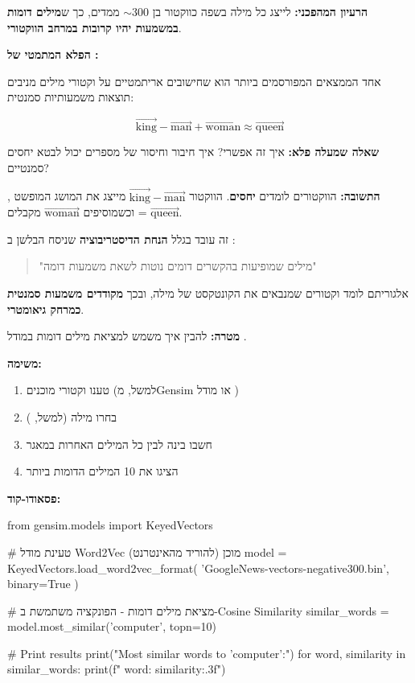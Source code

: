 \textbf{הרעיון המהפכני:} לייצג כל מילה בשפה כווקטור בן $\sim\num{300}$ ממדים, כך ש\textbf{מילים דומות במשמעות יהיו קרובות במרחב הווקטורי}.

\textbf{הפלא המתמטי של :}

אחד הממצאים המפורסמים ביותר הוא שחישובים אריתמטיים על וקטורי מילים מניבים תוצאות משמעותיות סמנטית:

\[
\vec{\text{king}} - \vec{\text{man}} + \vec{\text{woman}} \approx \vec{\text{queen}}
\]

\textbf{שאלה שמעלה פלא:} איך זה אפשרי? איך חיבור וחיסור של מספרים יכול לבטא יחסים סמנטיים?

\textbf{התשובה:} הווקטורים לומדים \textbf{יחסים}. הווקטור $\vec{\text{king}} - \vec{\text{man}}$ מייצג את המושג המופשט , וכשמוסיפים $\vec{\text{woman}}$ מקבלים  = $\vec{\text{queen}}$.

זה עובד בגלל \textbf{הנחת הדיסטריבוציה}  שניסח הבלשן  ב\en{-} \cite{harris1954}:

\begin{quote}
\textit{}

"מילים שמופיעות בהקשרים דומים נוטות לשאת משמעות דומה"
\end{quote}

אלגוריתם  לומד וקטורים שמנבאים את הקונטקסט של מילה, ובכך \textbf{מקודדים משמעות סמנטית כמרחק גיאומטרי}.


\textbf{מטרה:} להבין איך  משמש למציאת מילים דומות במודל .

\textbf{משימה:}
\begin{enumerate}
\item טענו וקטורי  מוכנים (למשל, מ\en{-}Gensim או מודל )
\item בחרו מילה (למשל, )
\item חשבו  בינה לבין כל המילים האחרות במאגר
\item הציגו את \num{10} המילים הדומות ביותר
\end{enumerate}

\textbf{פסאודו-קוד:}

\begin{pythonbox}
from gensim.models import KeyedVectors

# טעינת מודל Word2Vec מוכן (להוריד מהאינטרנט)
model = KeyedVectors.load_word2vec_format(
    'GoogleNews-vectors-negative300.bin', 
    binary=True
)

# מציאת מילים דומות - הפונקציה משתמשת ב-Cosine Similarity
similar_words = model.most_similar('computer', topn=10)

# Print results
print("Most similar words to 'computer':")
for word, similarity in similar_words:
    print(f"  {word}: {similarity:.3f}")
\end{pythonbox}


